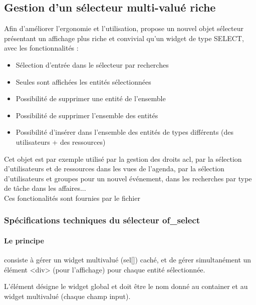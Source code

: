 

\subsection{Gestion d'un sélecteur multi-valué riche}
\label{of_select}

Afin d'améliorer l'ergonomie et l'utilisation, \obm propose un nouvel objet sélecteur présentant un affichage plus riche et convivial qu'un widget de type SELECT, avec les fonctionnalités :\\ 

\begin{itemize}
\item Sélection d'entrée dans le sélecteur par recherches
\item Seules sont affichées les entités sélectionnées
\item Possibilité de supprimer une entité de l'ensemble
\item Possibilité de supprimer l'ensemble des entités
\item Possibilité d'insérer dans l'ensemble des entités de types différents (des utilisateurs + des ressources)
\end{itemize}
\vspace{0.3cm}

Cet objet est par exemple utilisé par la gestion des droits acl, par la sélection d'utilisateurs et de ressources dans les vues de l'agenda, par la sélection d'utilisateurs et groupes pour un nouvel événement, dans les recherches par type de tâche dans les affaires...\\

Ces fonctionalités sont fournies par le fichier 


\subsubsection{Spécifications techniques du sélecteur of\_select}

\paragraph{Le principe} consiste à gérer un widget multivalué (sel[]) caché, et de gérer simultanément un élément <div> (pour l'affichage) pour chaque entité sélectionnée.

L'élément désigne le widget global et doit être le nom donné au container et au widget multivalué (chaque champ input).

